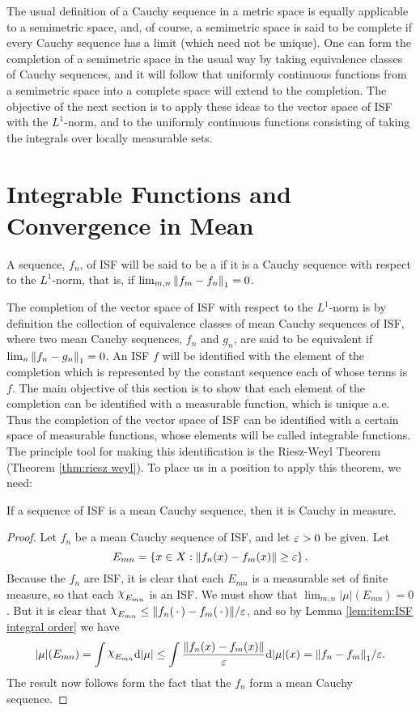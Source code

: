 The usual definition of a Cauchy sequence in a metric space is equally applicable to a semimetric space, and, of course, a semimetric space is said to be complete if every Cauchy sequence has a limit (which need not be unique). One can form the completion of a semimetric space in the usual way by taking equivalence classes of Cauchy sequences, and it will follow that uniformly continuous functions from a semimetric space into a complete space will extend to the completion. The objective of the next section is to apply these ideas to the vector space of ISF with the $L^1$-norm, and to the uniformly continuous functions consisting of taking the integrals over locally measurable sets.

\section{Integrable Functions and Convergence in Mean}

\begin{definition}
A sequence, $f_n$, of ISF will be said to be a  if it is a Cauchy sequence with respect to the $L^1$-norm, that is, if $\lim_{m, n}\norm{f_m-f_n}_1=0$.
\end{definition}

The completion of the vector space of ISF with respect to the $L^1$-norm is by definition the collection of equivalence classes of mean Cauchy sequences of ISF, where two mean Cauchy sequences, $f_n$ and $g_n$, are said to be equivalent if $\lim_n\norm{f_n-g_n}_1=0$. An ISF $f$ will be identified with the element of the completion which is represented by the constant sequence each of whose terms is $f$. The main objective of this section is to show that each element of the completion can be identified with a measurable function, which is unique a.e. Thus the completion of the vector space of ISF can be identified with a certain space of measurable functions, whose elements will be called integrable functions. The principle tool for making this identification is the Riesz-Weyl Theorem (Theorem \ref{thm:riesz weyl}). To place us in a position to apply this theorem, we need:

\begin{lemma}\label{lem:ISF mean cauchy implies cauchy in measure}
If a sequence of ISF is a mean Cauchy sequence, then it is Cauchy in measure.
\end{lemma}

\begin{proof}
Let $f_n$ be a mean Cauchy sequence of ISF, and let $\varepsilon>0$ be given. Let $$E_{mn}=\left\{x\in X:\norm{f_n(x)-f_m(x)}\geq\varepsilon\right\}.$$ Because the $f_n$ are ISF, it is clear that each $E_{mn}$ is a measurable set of finite measure, so that each $\idf{E_{mn}}$ is an ISF. We must show that $\lim_{m,n}|\mu|(E_{mn})=0$. But it is clear that $\idf{E_{mn}}\leq\norm{f_n(\imarg)-f_m(\imarg)}/\ep$, and so by Lemma \ref{lem:item:ISF integral order} we have $$|\mu|(E_{mn})=\int\idf{E_{mn}}\dd|\mu|\leq\int\frac{\norm{f_n(x)-f_m(x)}}{\ep}\dd|\mu|(x)=\norm{f_n-f_m}_1/\ep.$$ The result now follows form the fact that the $f_n$ form a mean Cauchy sequence.
\end{proof}

